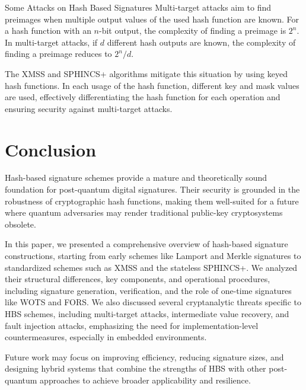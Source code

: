 \documentclass [version=submission]{iacrcc}
\begin{document}
\begin{section}{Some Attacks on Hash Based Signatures}
Multi-target attacks aim to find preimages when multiple output values of the used hash function are known. For a hash function with an $n$-bit output, the complexity of finding a preimage is $2^n$. In multi-target attacks, if $d$ different hash outputs are known, the complexity of finding a preimage reduces to $2^n / d$.

The XMSS and SPHINCS+ algorithms mitigate this situation by using keyed hash functions. In each usage of the hash function, different key and mask values are used, effectively differentiating the hash function for each operation and ensuring security against multi-target attacks.



\end{section}

\section{Conclusion}

Hash-based signature schemes provide a mature and theoretically sound foundation for post-quantum digital signatures. Their security is grounded in the robustness of cryptographic hash functions, making them well-suited for a future where quantum adversaries may render traditional public-key cryptosystems obsolete. 

In this paper, we presented a comprehensive overview of hash-based signature constructions, starting from early schemes like Lamport and Merkle signatures to standardized schemes such as XMSS and the stateless SPHINCS+. We analyzed their structural differences, key components, and operational procedures, including signature generation, verification, and the role of one-time signatures like WOTS and FORS. We also discussed several cryptanalytic threats specific to HBS schemes, including multi-target attacks, intermediate value recovery, and fault injection attacks, emphasizing the need for implementation-level countermeasures, especially in embedded environments.

 Future work may focus on improving efficiency, reducing signature sizes, and designing hybrid systems that combine the strengths of HBS with other post-quantum approaches to achieve broader applicability and resilience.



\end{document}
